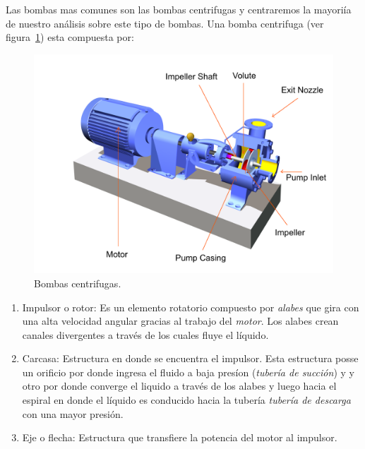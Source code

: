\documentclass[11pt, oneside]{article}
\begin{document}
Las bombas mas comunes son las bombas centrifugas y centraremos la mayori\'ia de nuestro an\'alisis sobre este tipo de bombas. Una bomba centrifuga (ver figura~\ref{bom1}) esta compuesta por:

\begin{figure}[h]
\centering
\includegraphics[width=12cm]{./figs/bom1.png}
\caption{Bombas centrifugas.} 
\label{bom1}
\end{figure}

\begin{enumerate}
\item Impulsor o rotor: Es un elemento rotatorio compuesto por \emph{alabes} que gira con una alta velocidad angular gracias al trabajo del \emph{motor}. Los alabes crean canales divergentes a trav\'es de los cuales fluye el l\'iquido.
\item Carcasa: Estructura en donde se encuentra el impulsor. Esta estructura posse un orificio por donde ingresa el fluido a baja pres\'ion (\emph{tuber\'ia de succi\'on}) y y otro por donde converge el liquido a trav\'es de los alabes y luego hacia el espiral en donde el l\'iquido es conducido hacia la tuber\'ia \emph{tuber\'ia de descarga} con una mayor presi\'on. 
\item Eje o flecha: Estructura que transfiere la potencia del motor al impulsor. 
\end{enumerate}

\end{document}
